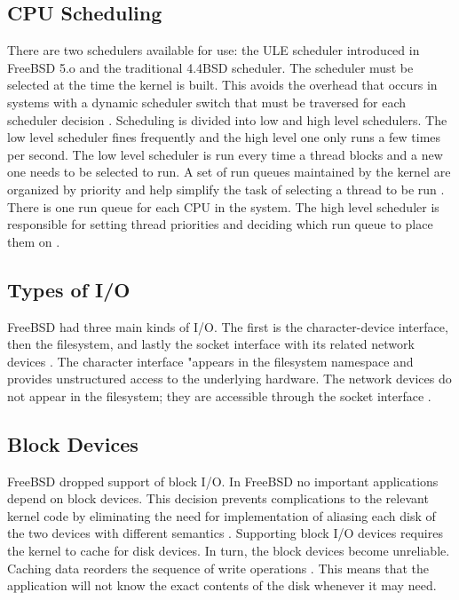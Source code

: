 \subsection{CPU Scheduling} %
There are two schedulers available for use: the ULE scheduler introduced in FreeBSD 5.o and the traditional 4.4BSD scheduler. The scheduler must be selected at the time the kernel is built. This avoids the overhead that occurs in systems with a dynamic scheduler switch that must be traversed for each scheduler decision \cite{Freebsdtext}. Scheduling is divided into low and high level schedulers. The low level scheduler fines frequently and the high level one only runs a few times per second. The low level scheduler is run every time a thread blocks and a new one needs to be selected to run. A set of run queues maintained by the kernel are organized by priority and help simplify the task of selecting a thread to be run \cite{Freebsdtext}. There is one run queue for each CPU in the system. The high level scheduler is responsible for setting thread priorities and deciding which run queue to place them on \cite{Freebsdtext}.

\subsection{Types of I/O}
FreeBSD had three main kinds of I/O. The first is the character-device interface, then the filesystem, and lastly the socket interface with its related network devices \cite{LinuxTextbook}. 
 The character interface "appears in the filesystem namespace and provides unstructured access to the underlying hardware. The network devices do not appear in the filesystem; they are accessible through the socket interface \cite{Freebsdtext}. 

\subsection{Block Devices}
FreeBSD dropped support of block I/O. In FreeBSD no important applications depend on block devices. This decision prevents complications to the relevant kernel code by eliminating the need for implementation of aliasing each disk of the two devices with different semantics \cite{freebsdArchitectureHandbook9}. Supporting block I/O devices requires the kernel to cache for disk devices. In turn, the block devices become unreliable. Caching data reorders the sequence of write operations \cite{freebsdArchitectureHandbook9}. This means that the application will not know the exact contents of the disk whenever it may need.


